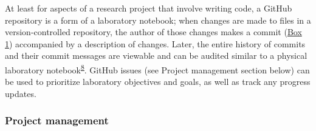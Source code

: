 At least for aspects of a research project that involve writing code, a GitHub repository is a form of a laboratory notebook; when changes are made to files in a version-controlled repository, the author of those changes makes a commit (\protect\hyperlink{definitions}{Box 1}) accompanied by a description of changes.
Later, the entire history of commits and their commit messages are viewable and can be audited similar to a physical laboratory notebook\textsuperscript{\protect\hyperlink{ref-4ny1onB0}{8}}.
GitHub issues (see Project management section below) can be used to prioritize laboratory objectives and goals, as well as track any progress updates.

\hypertarget{project-management}{%
\subsubsection{Project management}\label{project-management}}

